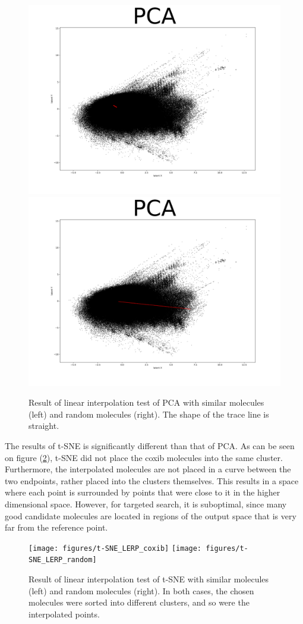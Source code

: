 \begin{figure}
	\centering
	\includegraphics[width=0.5\columnwidth]{figures/PCA_LERP_coxib}
	\includegraphics[width=0.5\columnwidth]{figures/PCA_LERP_random}
	\caption{Result of linear interpolation test of PCA with similar molecules (left) and random molecules (right). The shape of the trace line is straight.}
	\label{fig:pca:lerp}
\end{figure}

The results of t-SNE is significantly different than that of PCA. As can be seen on figure (\ref{fig:tsne:lerp}), t-SNE did not place the coxib molecules into the same cluster. Furthermore, the interpolated molecules are not placed in a curve between the two endpoints, rather placed into the clusters themselves. This results in a space where each point is surrounded by points that were close to it in the higher dimensional space. However, for targeted search, it is suboptimal, since many good candidate molecules are located in regions of the output space that is very far from the reference point.

\begin{figure}
	\centering
	\texttt{[image: figures/t-SNE\_LERP\_coxib]}
	\texttt{[image: figures/t-SNE\_LERP\_random]}
	\caption{Result of linear interpolation test of t-SNE with similar molecules (left) and random molecules (right). In both cases, the chosen molecules were sorted into different clusters, and so were the interpolated points.}
	\label{fig:tsne:lerp}
\end{figure}


